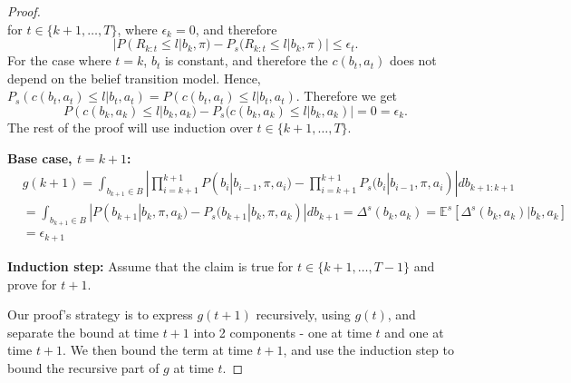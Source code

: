 \documentclass[acmlarge, manuscript, screen, review, natbib=false, oneside]{acmart}
\begin{document}
\begin{proof}
\begin{equation}
	\end{equation}
	for $t \in \{k+1,\dots, T\}$, where $\epsilon_k=0$, and therefore 
	\begin{equation}
		|P(R_{k:t}\leq l|b_k,\pi)-P_s(R_{k:t}\leq l|b_k,\pi)|\leq \epsilon_t.
	\end{equation}
	For the case where $t=k$, $b_t$ is constant, and therefore the $c(b_t, a_t)$ does not depend on the belief transition model. Hence, $P_s(c(b_t, a_t)\leq l|b_t, a_t)=P(c(b_t, a_t)\leq l|b_t, a_t)$. Therefore we get
	\begin{equation}
		P(c(b_k, a_k)\leq l|b_k, a_k) - P_s(c(b_k, a_k)\leq l|b_k, a_k)|=0=\epsilon_k.
	\end{equation}
	The rest of the proof will use induction over $t\in \{k+1, \dots, T\}$.
	
	\textbf{Base case, $t=k+1$:}
	\begin{equation}
		\begin{aligned}
			&g(k+1)=\int_{b_{k+1}\in B} |\prod_{i=k+1}^{k+1} P(b_i|b_{i-1}, \pi, a_i) 
			- \prod_{i=k+1}^{k+1} P_s(b_i|b_{i-1}, \pi, a_i)|db_{k+1:k+1} \\
			&= \int_{b_{k+1}\in B} |P(b_{k+1}|b_{k}, \pi, a_{k}) - P_s(b_{k+1}|b_{k}, \pi, a_k)|db_{k+1} 
			= \Delta^s(b_{k}, a_k)=\mathbb{E}^s[\Delta^s(b_{k}, a_k)|b_k,a_k] \\
			&= \epsilon_{k+1}
		\end{aligned}
	\end{equation} 
	
	\textbf{Induction step:} Assume that the claim is true for $t\in \{k+1, \dots, T-1\}$ and prove for $t+1$.
	
	Our proof's strategy is to express $g(t+1)$ recursively, using $g(t)$, and separate the bound at time $t+1$ into 2 components - one at time $t$ and one at time $t+1$. We then bound the term at time $t+1$, and use the induction step to bound the recursive part of $g$ at time $t$. 
	

\end{proof}
\end{document}
